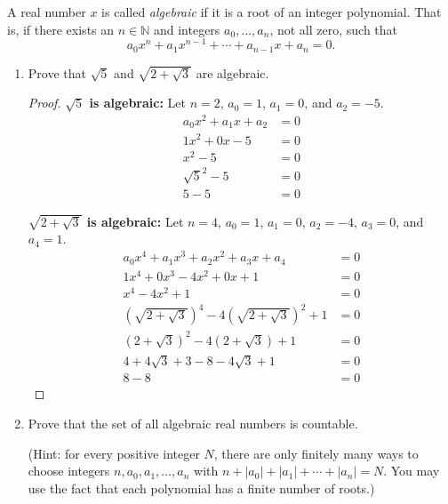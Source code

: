 \documentclass[10pt]{article}
\newcommand{\N}{\mathbb{N}}
\newcommand{\abs}[1]{\left| #1 \right|}
\newenvironment{problem}[2][Problem]{\begin{trivlist}
\item[\hskip \labelsep {\bfseries #1}\hskip \labelsep {\bfseries #2.}]}{\end{trivlist}}
\begin{document}
\newpage

\begin{problem}{2} 
A real number $x$ is called \emph{algebraic} if it is a root of an integer polynomial. That is, if there exists an $n \in \N$ and integers $a_0, \dots, a_n$, not all zero, such that
\begin{equation*}
a_0 x^n + a_1 x^{n-1} + \cdots + a_{n-1} x + a_n = 0.
\end{equation*}

\begin{enumerate}
	\item
	Prove that $\sqrt{5}$ and $\sqrt{2 + \sqrt{3}}$ are algebraic.

    \begin{proof}
        \hfill

        \textbf{$\sqrt{5}$ is algebraic:} Let $n = 2$, $a_0 = 1$, $a_1 = 0$, and $a_2 = -5$. 
        \begin{align*}
            a_0 x^2 + a_1 x + a_2 &= 0 \\
            1 x^2 + 0 x - 5 &= 0 \\
            x^2 - 5 &= 0 \\
            \sqrt{5}^2 - 5 &= 0 \\
            5 - 5 &= 0
        \end{align*}

        \textbf{$\sqrt{2 + \sqrt{3}}$ is algebraic:} Let $n = 4$, $a_0 = 1$, $a_1 = 0$, $a_2 = -4$, $a_3 = 0$, and $a_4 = 1$.
        \begin{align*}
            a_0 x^4 + a_1 x^3 + a_2 x^2 + a_3 x + a_4 &= 0 \\
            1 x^4 + 0 x^3 - 4 x^2 + 0 x + 1 &= 0 \\
            x^4 - 4 x^2 + 1 &= 0 \\
            \left(\sqrt{2 + \sqrt{3}}\right)^4 - 4\left(\sqrt{2 + \sqrt{3}}\right)^2 + 1 &= 0 \\
            \left(2 + \sqrt{3}\right)^2 - 4\left(2 + \sqrt{3}\right) + 1 &= 0 \\
            4 + 4\sqrt{3} + 3 - 8 - 4\sqrt{3} + 1 &= 0 \\
            8 - 8 &= 0
        \end{align*}
    \end{proof}
	
	\item 
	Prove that the set of all algebraic real numbers is countable.  
	
	\noindent (Hint: for every positive integer $N$, there are
	only finitely many ways to choose integers $n, a_0, a_1, \dots, a_n$ with $n + \abs{a_0} + \abs{a_1} + \cdots + \abs{a_n} = N$.  You may use the fact that each polynomial has a finite number of roots.)


\end{enumerate}
\end{problem}
\end{document}
